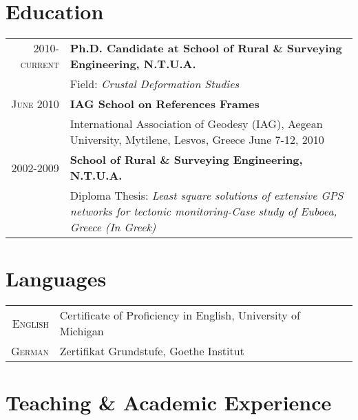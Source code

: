 \documentclass[a4paper,10pt]{article} %
\begin{document}
\section{Education}
\begin{tabular}{rp{13cm}}

  \textsc{2010-current} &\textbf{Ph.D. Candidate at School of Rural \& Surveying Engineering, N.T.U.A.}\\
   & Field: \textit{Crustal Deformation Studies}\\

  \textsc{June 2010} & \textbf{IAG School on References Frames}\\
    & International Association of Geodesy \small{(IAG)}, Aegean University, Mytilene, Lesvos, Greece June 7-12, 2010\\

  \textsc{2002-2009} & \textbf{School of Rural \& Surveying Engineering, N.T.U.A.}\\
  & Diploma Thesis: 
  \textit{Least square solutions of extensive GPS networks for tectonic monitoring-Case study of Euboea, Greece (In Greek)}\\

\end{tabular}
\medskip

\section{Languages}
\begin{tabular}{rp{13cm}}

\textsc{English} & Certificate of Proficiency in English, University of Michigan \\
\textsc{German} & Zertifikat Grundstufe, Goethe Institut\\

\end{tabular}
\medskip

\section{Teaching \& Academic Experience}
\end{document}

